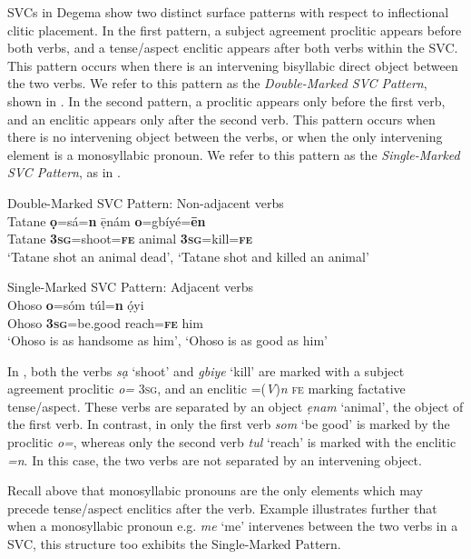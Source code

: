 \documentclass[output=paper]{langsci/langscibook}
\begin{document}
SVCs in Degema show two distinct surface patterns with respect to inflectional clitic placement. In the first pattern, a subject agreement proclitic appears before both verbs, and a tense/aspect enclitic appears after both verbs within the SVC. This pattern occurs when there is an intervening bisyllabic direct object between the two verbs. We refer to this pattern as the \textit{Double-Marked SVC Pattern}, shown in . In the second pattern, a proclitic appears only before the first verb, and an enclitic appears only after the second verb. This pattern occurs when there is no intervening object between the verbs, or when the only intervening element is a monosyllabic pronoun. We refer to this pattern as the \textit{Single-Marked SVC Pattern}, as in .

\ea\label{ex:rolle:9}
{Double-Marked SVC Pattern: Non-adjacent verbs}\\
\gll  Tatane  \textbf{ọ}=sá=\textbf{n}      ẹ̄nám  \textbf{o}=gbíyé=\textbf{ēn}\\
     Tatane  \textbf{3}\textbf{\textsc{sg}}=shoot=\textbf{\textsc{fe}}  animal  \textbf{3}\textbf{\textsc{sg}}=kill=\textbf{\textsc{fe}}\\
\glt ‘Tatane shot an animal dead’, ‘Tatane shot and killed an animal’
\z

\ea\label{ex:rolle:10}
{Single-Marked SVC Pattern: Adjacent verbs}\\
\gll  Ohoso   \textbf{o}=sóm       túl=\textbf{n}     ọ́yi\\
     Ohoso  \textbf{3}\textbf{\textsc{sg}}=be.good    reach=\textbf{\textsc{fe}}  him\\
\glt ‘Ohoso is as handsome as him’, ‘Ohoso is as good as him’
\z

In , both the verbs \textit{sạ} ‘shoot’ and \textit{gbiye} ‘kill’ are marked with a subject agreement proclitic \textit{o=} \textsc{3sg}, and an enclitic =(\textit{V})\textit{n} \textsc{fe} marking factative tense/aspect. These verbs are separated by an object \textit{ẹnam} ‘animal’, the object of the first verb. In contrast, in  only the first verb \textit{som} ‘be good’ is marked by the proclitic \textit{o=}, whereas only the second verb \textit{tul} ‘reach’ is marked with the enclitic \textit{=n}. In this case, the two verbs are not separated by an intervening object. 

Recall above that monosyllabic pronouns are the only elements which may precede tense/aspect enclitics after the verb. Example  illustrates further that when a monosyllabic pronoun e.g. \textit{me} ‘me’ intervenes between the two verbs in a SVC, this structure too exhibits the Single-Marked Pattern. 
\end{document}
